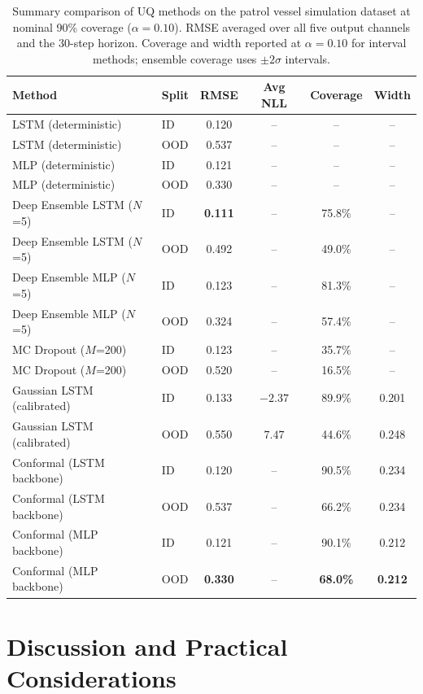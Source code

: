 \documentclass[a4paper,fleqn]{cas-sc}
\begin{document}
\begin{table}[t]
\centering
\caption{Summary comparison of UQ methods on the patrol vessel simulation dataset at nominal 90\% coverage ($\alpha=0.10$). RMSE averaged over all five output channels and the 30-step horizon. Coverage and width reported at $\alpha=0.10$ for interval methods; ensemble coverage uses $\pm2\sigma$ intervals.}
\label{tab:uq-summary}
\begin{tabular}{llcccc}
\toprule
\textbf{Method} & \textbf{Split} & \textbf{RMSE} & \textbf{Avg NLL} & \textbf{Coverage} & \textbf{Width} \\
\midrule
LSTM (deterministic) & ID  & 0.120 & -- & -- & -- \\
LSTM (deterministic) & OOD & 0.537 & -- & -- & -- \\
MLP (deterministic)  & ID  & 0.121 & -- & -- & -- \\
MLP (deterministic)  & OOD & 0.330 & -- & -- & -- \\
\midrule
Deep Ensemble LSTM ($N$=5) & ID  & \textbf{0.111} & -- & 75.8\% & -- \\
Deep Ensemble LSTM ($N$=5) & OOD & 0.492          & -- & 49.0\% & -- \\
Deep Ensemble MLP ($N$=5)  & ID  & 0.123          & -- & 81.3\% & -- \\
Deep Ensemble MLP ($N$=5)  & OOD & 0.324          & -- & 57.4\% & -- \\
\midrule
MC Dropout ($M$=200)       & ID  & 0.123 & -- & 35.7\% & -- \\
MC Dropout ($M$=200)       & OOD & 0.520 & -- & 16.5\% & -- \\
\midrule
Gaussian LSTM (calibrated) & ID  & 0.133 & $-2.37$ & 89.9\% & 0.201 \\
Gaussian LSTM (calibrated) & OOD & 0.550 & $7.47$  & 44.6\% & 0.248 \\
\midrule
Conformal (LSTM backbone)  & ID  & 0.120 & -- & 90.5\% & 0.234 \\
Conformal (LSTM backbone)  & OOD & 0.537 & -- & 66.2\% & 0.234 \\
Conformal (MLP backbone)   & ID  & 0.121 & -- & 90.1\% & 0.212 \\
Conformal (MLP backbone)   & OOD & \textbf{0.330} & -- & \textbf{68.0\%} & \textbf{0.212} \\
\bottomrule
\end{tabular}
\end{table}

\section{Discussion and Practical Considerations}
\label{sec:limitations}
\end{document}
